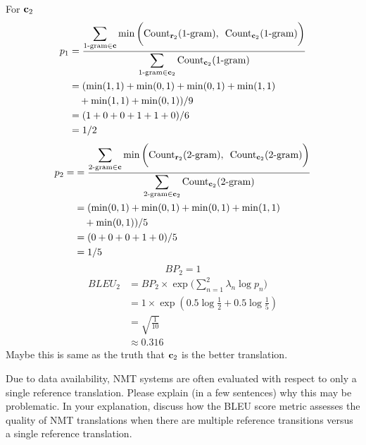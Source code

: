 \begin{parts}
\begin{subparts}
{        For $\mathbf{c}_2$
        \begin{align*}
            p_1
            & = \frac{ \displaystyle \sum_{\text{1-gram} \in \mathbf{c}} \min \bigg( \text{Count}_{\mathbf{r}_2}(\text{1-gram}), \enspace \text{Count}_{\mathbf{c}_2}(\text{1-gram}) \bigg) }{\displaystyle \sum_{\text{1-gram}\in \mathbf{c}_2} \text{Count}_{\mathbf{c}_2}(\text{1-gram})} \\
            & = (\min(1, 1)+\min(0, 1)+\min(0, 1)+\min(1, 1) \\
            & \quad +\min(1, 1) +\min(0, 1))/9 \\
            & = (1+0+0+1+1+0)/6 \\
            & = 1/2
        \end{align*}
        \begin{align*}
            p_2 = 
            & = \frac{ \displaystyle \sum_{\text{2-gram} \in \mathbf{c}} \min \bigg( \text{Count}_{\mathbf{r}_2}(\text{2-gram}), \enspace \text{Count}_{\mathbf{c}_2}(\text{2-gram}) \bigg) }{\displaystyle \sum_{\text{2-gram}\in \mathbf{c}_2} \text{Count}_{\mathbf{c}_2}(\text{2-gram})} \\
            & = (\min(0, 1)+\min(0, 1)+\min(0, 1)+\min(1, 1) \\
            & \quad + \min(0, 1)) / 5 \\
            & = (0+0+0+1+0)/5 \\
            & = 1/5
        \end{align*}
        \[BP_2=1\]
        \begin{align*}
            BLEU_2
            & = BP_2 \times \exp \Big( \sum_{n=1}^2 \lambda_n \log p_n \Big) \\
            & = 1 \times \exp(0.5 \log \frac{1}{2}+ 0.5 \log \frac{1}{5}) \\
            & = \sqrt{\frac{1}{10}} \\
            & \approx  0.316
        \end{align*}
        Maybe this is same as the truth that $\mathbf{c}_2$ is the better translation.
        }
        
        \subpart[2] Due to data availability, NMT systems are often evaluated with respect to only a single reference translation. Please explain (in a few sentences) why this may be problematic. In your explanation, discuss how the BLEU score metric assesses the quality of NMT translations when there are multiple reference transitions versus a single reference translation.
        
        

\end{subparts}
\end{parts}

